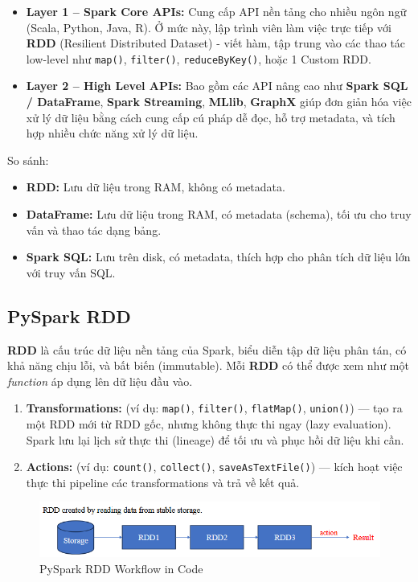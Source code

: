 \documentclass[11pt]{article}
\begin{document}
\begin{itemize}
    \item \textbf{Layer 1 -- Spark Core APIs:} Cung cấp API nền tảng cho nhiều ngôn ngữ (Scala, Python, Java, R). Ở mức này, lập trình viên làm việc trực tiếp với \textbf{RDD} (Resilient Distributed Dataset) - viết hàm, tập trung vào các thao tác low-level như \texttt{map()}, \texttt{filter()}, \texttt{reduceByKey()}, hoặc 1 Custom RDD.
    \item \textbf{Layer 2 -- High Level APIs:} Bao gồm các API nâng cao như \textbf{Spark SQL / DataFrame}, \textbf{Spark Streaming}, \textbf{MLlib}, \textbf{GraphX} giúp đơn giản hóa việc xử lý dữ liệu bằng cách cung cấp cú pháp dễ đọc, hỗ trợ metadata, và tích hợp nhiều chức năng xử lý dữ liệu.
\end{itemize}
So sánh:
\begin{itemize}
    \item \textbf{RDD:} Lưu dữ liệu trong RAM, không có metadata.
    \item \textbf{DataFrame:} Lưu dữ liệu trong RAM, có metadata (schema), tối ưu cho truy vấn và thao tác dạng bảng.
    \item \textbf{Spark SQL:} Lưu trên disk, có metadata, thích hợp cho phân tích dữ liệu lớn với truy vấn SQL.
\end{itemize}


\subsection{PySpark RDD}
\textbf{RDD} là cấu trúc dữ liệu nền tảng của Spark, biểu diễn tập dữ liệu phân tán, có khả năng chịu lỗi, và bất biến (immutable). Mỗi \textbf{RDD} có thể được xem như một \textit{function} áp dụng lên dữ liệu đầu vào.
\begin{enumerate}
    \item \textbf{Transformations:} (ví dụ: \texttt{map()}, \texttt{filter()}, \texttt{flatMap()}, \texttt{union()}) — tạo ra một RDD mới từ RDD gốc, nhưng không thực thi ngay (lazy evaluation). Spark lưu lại lịch sử thực thi (lineage) để tối ưu và phục hồi dữ liệu khi cần.
    \item \textbf{Actions:} (ví dụ: \texttt{count()}, \texttt{collect()}, \texttt{saveAsTextFile()}) — kích hoạt việc thực thi pipeline các transformations và trả về kết quả.
\end{enumerate}

\begin{figure}[H]
    \centering
    \includegraphics[width=0.7\linewidth]{pysparkRDD_code.png}
    \caption{PySpark RDD Workflow in Code}
\end{figure}
\end{document}
